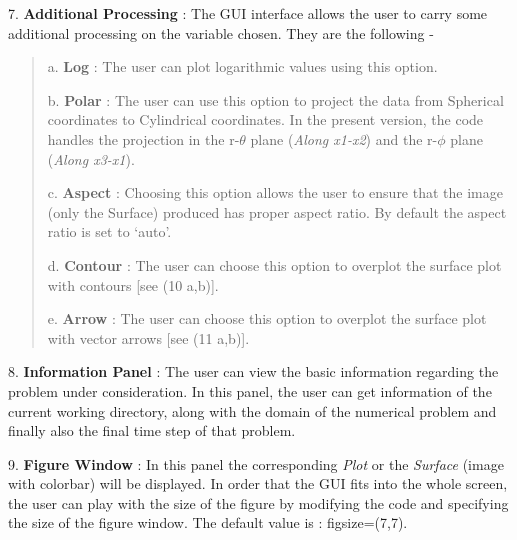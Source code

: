 \documentclass[letterpaper,10pt,english]{sphinxmanual}
\begin{document}
7. \textbf{Additional Processing} : The GUI interface allows the user to
carry some additional processing on the variable chosen. They are the
following -
\begin{quote}

a. \textbf{Log} : The user can plot logarithmic values using this
option.

b. \textbf{Polar} : The user can use this option to project the data from
Spherical coordinates to Cylindrical coordinates. In the present
version, the code handles the projection in the r-\(\theta\) plane
(\emph{Along x1-x2}) and the r-\(\phi\) plane (\emph{Along x3-x1}).

c. \textbf{Aspect} : Choosing this option allows the user to ensure that the
image (only the Surface) produced has proper aspect ratio. By default
the aspect ratio is set to `auto'.

d. \textbf{Contour} : The user can choose this option to overplot the
surface
plot with contours {[}see (10 a,b){]}.

e. \textbf{Arrow} : The user can choose this option to overplot the surface
plot with vector arrows {[}see (11 a,b){]}.
\end{quote}

8. \textbf{Information Panel} : The user can view the basic information
regarding the problem under consideration. In this panel, the user
can get information of the current working directory, along with the
domain of the numerical problem and finally also the final time
step of that problem.

9. \textbf{Figure Window} : In this panel the corresponding \emph{Plot} or the \emph{Surface} (image with colorbar) will be displayed. In
order that the GUI fits into the whole screen, the user can play with
the size of the figure by modifying the code and specifying the size
of the figure window. The default value is : figsize=(7,7).
\end{document}
